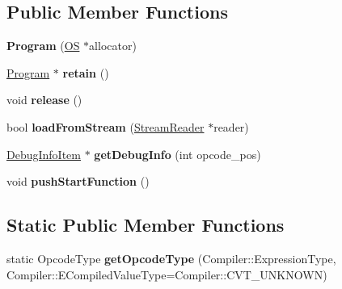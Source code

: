 \subsection*{Public Member Functions}
\begin{DoxyCompactItemize}
\item 
{\bfseries Program} (\hyperlink{class_object_script_1_1_o_s}{OS} $\ast$allocator)\hypertarget{class_object_script_1_1_o_s_1_1_core_1_1_program_a58c35252b2da07e5ffa3fb2ca78d411a}{}\label{class_object_script_1_1_o_s_1_1_core_1_1_program_a58c35252b2da07e5ffa3fb2ca78d411a}

\item 
\hyperlink{class_object_script_1_1_o_s_1_1_core_1_1_program}{Program} $\ast$ {\bfseries retain} ()\hypertarget{class_object_script_1_1_o_s_1_1_core_1_1_program_acc32e91662fabb782114f732d0556e31}{}\label{class_object_script_1_1_o_s_1_1_core_1_1_program_acc32e91662fabb782114f732d0556e31}

\item 
void {\bfseries release} ()\hypertarget{class_object_script_1_1_o_s_1_1_core_1_1_program_aa21315ca0c7c260a8fbb207dbbb4fc18}{}\label{class_object_script_1_1_o_s_1_1_core_1_1_program_aa21315ca0c7c260a8fbb207dbbb4fc18}

\item 
bool {\bfseries load\+From\+Stream} (\hyperlink{class_object_script_1_1_o_s_1_1_core_1_1_stream_reader}{Stream\+Reader} $\ast$reader)\hypertarget{class_object_script_1_1_o_s_1_1_core_1_1_program_af7781322dcae61710c4d0500420dfa00}{}\label{class_object_script_1_1_o_s_1_1_core_1_1_program_af7781322dcae61710c4d0500420dfa00}

\item 
\hyperlink{struct_object_script_1_1_o_s_1_1_core_1_1_program_1_1_debug_info_item}{Debug\+Info\+Item} $\ast$ {\bfseries get\+Debug\+Info} (int opcode\+\_\+pos)\hypertarget{class_object_script_1_1_o_s_1_1_core_1_1_program_a748faec38c8148fdcb67cccbba5035b9}{}\label{class_object_script_1_1_o_s_1_1_core_1_1_program_a748faec38c8148fdcb67cccbba5035b9}

\item 
void {\bfseries push\+Start\+Function} ()\hypertarget{class_object_script_1_1_o_s_1_1_core_1_1_program_a763ff9c82ab354cab6bc25193e20fb01}{}\label{class_object_script_1_1_o_s_1_1_core_1_1_program_a763ff9c82ab354cab6bc25193e20fb01}

\end{DoxyCompactItemize}
\subsection*{Static Public Member Functions}
\begin{DoxyCompactItemize}
\item 
static Opcode\+Type {\bfseries get\+Opcode\+Type} (Compiler\+::\+Expression\+Type, Compiler\+::\+E\+Compiled\+Value\+Type=Compiler\+::\+C\+V\+T\+\_\+\+U\+N\+K\+N\+O\+WN)\hypertarget{class_object_script_1_1_o_s_1_1_core_1_1_program_a286be89029649d041d8b8a2bf4ecdb7e}{}\label{class_object_script_1_1_o_s_1_1_core_1_1_program_a286be89029649d041d8b8a2bf4ecdb7e}

\end{DoxyCompactItemize}
